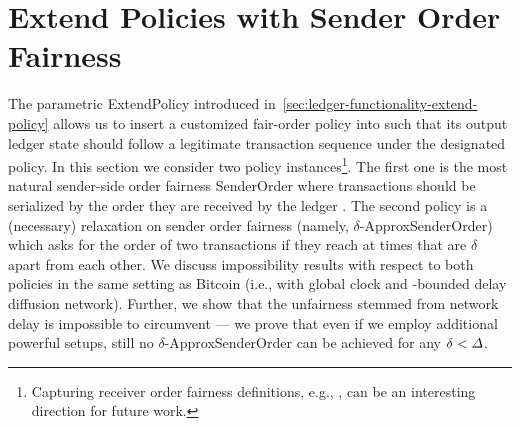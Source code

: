 \section{Extend Policies with Sender Order Fairness}
\label{sec:extend-policies-with-order-fairness}

The parametric \textsf{ExtendPolicy} introduced in~\cref{sec:ledger-functionality-extend-policy} allows us to insert a customized fair-order policy into \funcFairLedger such that its output ledger state should follow a legitimate transaction sequence under the designated policy.
%
In this section we consider two policy instances\footnote{Capturing receiver order fairness definitions, e.g., \cite{C:KZGJ20,FC:CMSZ22}, can be an interesting direction for future work.}.
%
The first one is the most natural sender-side order fairness \textsf{SenderOrder} where transactions should be serialized by the order they are received by the ledger \funcFairLedger.
%
The second policy is a (necessary) relaxation on sender order fairness (namely, $\delta$-\textsf{ApproxSenderOrder}) which asks for the order of two transactions if they reach \funcFairLedger at times that are $\delta$ apart from each other.
%
We discuss impossibility results with respect to both policies in the same setting as Bitcoin (i.e., with global clock and \delay-bounded delay diffusion network).
%
Further, we show that the unfairness stemmed from network delay is impossible to circumvent --- we prove that even if we employ additional powerful setups, still no $\delta$-\textsf{ApproxSenderOrder} can be achieved for any $\delta < \varDelta$.



